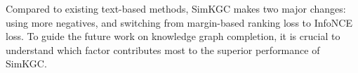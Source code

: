 \documentclass[11pt]{article}
\begin{document}
Compared to existing text-based methods,
SimKGC makes two major changes:
using more negatives,
and switching from margin-based ranking loss to InfoNCE loss.
To guide the future work on knowledge graph completion,
it is crucial to understand which factor contributes most
to the superior performance of SimKGC.

\begin{table}[ht]
\centering
{}
\caption{Analysis of loss function and the number of negatives on the WN18RR dataset.}
\label{tab:ablation_key_factor}
\end{table}
\end{document}
